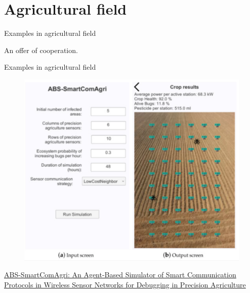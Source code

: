 \documentclass[9pt]{beamer}
\begin{document}
\section{Agricultural field}

\begin{frame}{Examples in agricultural field}

An offer of cooperation.


\end{frame}

\begin{frame}{Examples in agricultural field}

\begin{figure}[H]
\center
\includegraphics[scale=0.32]{agr1.png}
\label{agr1}
\end{figure}

\href{https://www.mdpi.com/1424-8220/18/4/998}{ABS-SmartComAgri: An Agent-Based Simulator of Smart Communication Protocols in Wireless Sensor Networks for Debugging in Precision Agriculture}

\end{frame}
\end{document}
